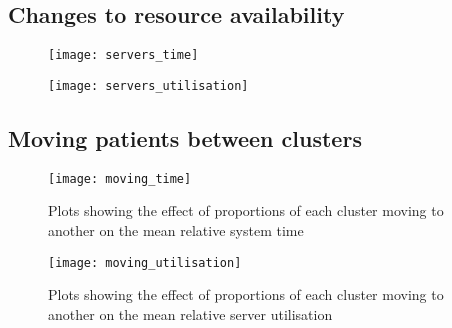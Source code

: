\subsection{Changes to resource availability}\label{subsec:resources}

\begin{figure}
    \centering
    \begin{minipage}{\halfimgwidth}
        \texttt{[image: servers\_time]}
        \label{fig:servers_time}
    \end{minipage}\hfill%
    \begin{minipage}{\halfimgwidth}
        \texttt{[image: servers\_utilisation]}
        \label{fig:servers_utilisation}
\end{minipage}
\end{figure}

\subsection{Moving patients between clusters}\label{subsec:moving}

\begin{figure}
    \centering
    \texttt{[image: moving\_time]}
    \caption{Plots showing the effect of proportions of each cluster moving to
    another on the mean relative system time}\label{fig:moving_time}
\end{figure}

\begin{figure}
    \centering
    \texttt{[image: moving\_utilisation]}
    \caption{Plots showing the effect of proportions of each cluster moving to
    another on the mean relative server
    utilisation}\label{fig:moving_utilisation}
\end{figure}
